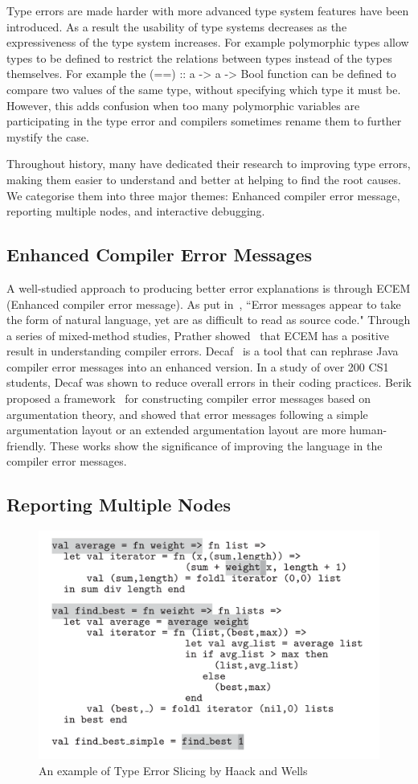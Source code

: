 Type errors are made harder with more advanced type system features have been introduced. As a result the usability of type systems decreases as the expressiveness of the type system increases. For example polymorphic types allow types to be defined to restrict the relations between types instead of the types themselves. For example the (==) :: a -> a -> Bool function can be defined to compare two values of the same type, without specifying which type it must be. However, this adds confusion when too many polymorphic variables are participating in the type error and compilers sometimes rename them to further mystify the case.


Throughout history, many have dedicated their research to improving type errors, making them easier to understand and better at helping to find the root causes. We categorise them into three major themes: Enhanced compiler error message, reporting multiple nodes, and interactive debugging.

\subsection{Enhanced Compiler Error Messages}

A well-studied approach to producing better error explanations is through ECEM (Enhanced compiler error message).  As put in~\cite{Barik2017-gy}, ``Error messages appear to take the form of natural language, yet are as difficult to read as source code."   Through a series of mixed-method studies, Prather showed~\cite{Prather2017-dg} that ECEM has a positive result in understanding compiler errors. Decaf~\cite{Becker2016-kc} is a tool that can rephrase Java compiler error messages into an enhanced version. In a study of over 200 CS1 students, Decaf was shown to reduce overall errors in their coding practices. Berik proposed a framework~\cite{Barik2018-xs} for constructing compiler error messages based on argumentation theory, and showed that error messages following a simple argumentation layout or an extended argumentation layout are more human-friendly.  These works show the significance of improving the language in the compiler error messages. 


\subsection{Reporting Multiple Nodes}

\begin{figure}[hbt]
    \includegraphics[width=0.6\linewidth]{HaackTypeErrorSlicing}
    \caption{An example of Type Error Slicing by Haack and Wells
    }
\end{figure}

